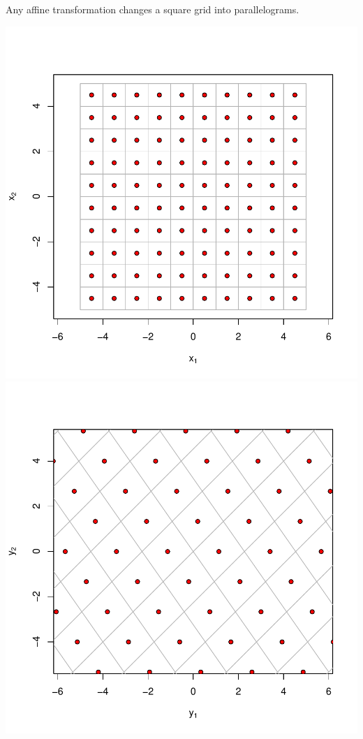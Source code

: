 \documentclass[landscape,footrule]{foils}
\begin{document}
Any affine transformation changes a square grid into parallelograms. \vspace*{-1cm}
\begin{center}
\includegraphics[scale=0.55]{original-grid.pdf}
\includegraphics[scale=0.55]{transformed-grid.pdf}
\end{center}\vspace*{-1cm}
\end{document}
